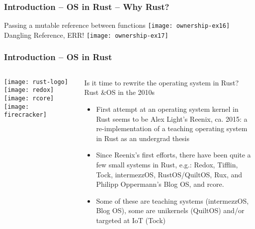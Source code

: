 \begin{frame}[plain]	
	\frametitle{Introduction -- OS in Rust -- Why Rust?}
	\centering
	Passing a mutable reference between functions
	\texttt{[image: ownership-ex16]}
	Dangling Reference, ERR!
	\texttt{[image: ownership-ex17]}

\end{frame}
\begin{frame}[plain]
	\frametitle{Introduction -- OS in Rust}
	
	
	
	\begin{columns}
		
		\begin{column}{.2\textwidth}
			
			\texttt{[image: rust-logo]}
			\texttt{[image: redox]}
			\texttt{[image: rcore]}
			\texttt{[image: firecracker]}
		\end{column}
		
		\begin{column}{.8\textwidth}
			
		Is it time to rewrite the operating
		system in Rust?
		 \\
		
	Rust \&OS in the 2010s

\begin{itemize}
	
	\item  First attempt at an operating system kernel in Rust seems to be
	Alex Light’s Reenix, ca. 2015: a re-implementation of a teaching
	operating system in Rust as an undergrad thesis
	
	
	\item  Since Reenix’s first efforts, there have been quite a few small
	systems in Rust, e.g.: Redox, Tifflin, Tock, intermezzOS,
	RustOS/QuiltOS, Rux, and Philipp Oppermann’s Blog OS, and rcore.
	
	\item Some of these are teaching systems (intermezzOS, Blog OS),
	some are unikernels (QuiltOS) and/or targeted at IoT (Tock)
	
	
\end{itemize}

		\end{column}
		
		
	\end{columns}
	
	
\end{frame}



